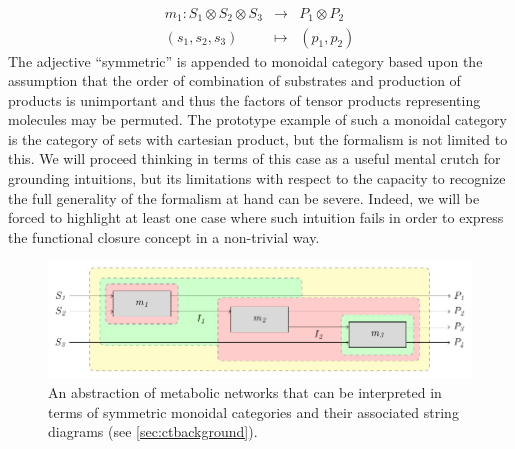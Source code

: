 \documentclass[10pt]{article}
\theoremstyle{plain}
\theoremstyle{definition}
\theoremstyle{remark}
\begin{document}
\begin{eqnarray*}
m_1 \colon S_1 \otimes S_2 \otimes S_3 &\longrightarrow& P_1 \otimes P_2\\
(s_1,s_2,s_3) &\longmapsto& (p_1,p_2)
\end{eqnarray*}
The adjective ``symmetric'' is appended to monoidal category based upon the assumption that the order of combination of substrates and production of products is unimportant and thus the factors of tensor products representing molecules may be permuted. The prototype example of such a monoidal category is the category of sets with cartesian product, but the formalism is not limited to this. We will proceed thinking in terms of this case as a useful mental crutch for grounding intuitions, but its limitations with respect to the capacity to recognize the full generality of the formalism at hand can be severe. Indeed, we will be forced to highlight at least one case where such intuition fails in order to express the functional closure concept in a non-trivial way.

\begin{figure}
\begin{center}
\noindent\includegraphics[width=0.9\columnwidth]{fig/blockdiagtop.pdf}
\end{center}
\caption[Abstraction of a metabolic network]{An abstraction of metabolic networks that can be interpreted in terms of symmetric monoidal categories and their associated string diagrams (see \ref{sec:ctbackground}).}
\label{fig:metabolicstringdiag}
\end{figure}
\end{document}
